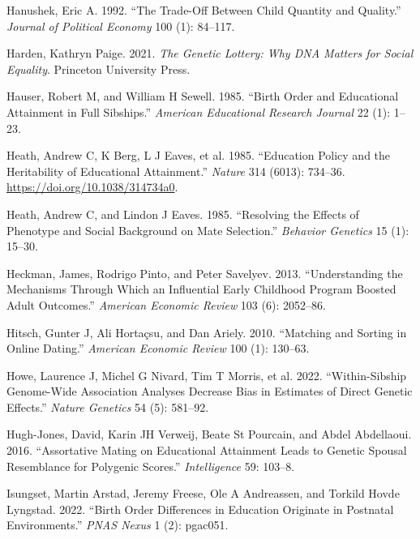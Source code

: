 \documentclass[
  12pt,
]{article}
\newlength{\cslhangindent}
\newenvironment{CSLReferences}[2] %
 {\begin{list}{}{%
  \setlength{\itemindent}{0pt}
  \setlength{\leftmargin}{0pt}
  \setlength{\parsep}{0pt}
  \ifodd #1
   \setlength{\leftmargin}{\cslhangindent}
   \setlength{\itemindent}{-1\cslhangindent}
  \fi
  \setlength{\itemsep}{#2\baselineskip}}}
 {\end{list}}
\theoremstyle{definition}
\theoremstyle{definition}
\theoremstyle{definition}
\theoremstyle{definition}
\theoremstyle{remark}
\begin{document}
\begin{CSLReferences}{1}{1}
Hanushek, Eric A. 1992. {``The Trade-Off Between Child Quantity and Quality.''} \emph{Journal of Political Economy} 100 (1): 84--117.

Harden, Kathryn Paige. 2021. \emph{The Genetic Lottery: Why DNA Matters for Social Equality}. Princeton University Press.

Hauser, Robert M, and William H Sewell. 1985. {``Birth Order and Educational Attainment in Full Sibships.''} \emph{American Educational Research Journal} 22 (1): 1--23.

Heath, Andrew C, K Berg, L J Eaves, et al. 1985. {``Education Policy and the Heritability of Educational Attainment.''} \emph{Nature} 314 (6013): 734--36. \url{https://doi.org/10.1038/314734a0}.

Heath, Andrew C, and Lindon J Eaves. 1985. {``Resolving the Effects of Phenotype and Social Background on Mate Selection.''} \emph{Behavior Genetics} 15 (1): 15--30.

Heckman, James, Rodrigo Pinto, and Peter Savelyev. 2013. {``Understanding the Mechanisms Through Which an Influential Early Childhood Program Boosted Adult Outcomes.''} \emph{American Economic Review} 103 (6): 2052--86.

Hitsch, Gunter J, Ali Hortaçsu, and Dan Ariely. 2010. {``Matching and Sorting in Online Dating.''} \emph{American Economic Review} 100 (1): 130--63.

{Howe, Laurence J, Michel G Nivard, Tim T Morris, et al.} 2022. {``Within-Sibship Genome-Wide Association Analyses Decrease Bias in Estimates of Direct Genetic Effects.''} \emph{Nature Genetics} 54 (5): 581--92.

Hugh-Jones, David, Karin JH Verweij, Beate St Pourcain, and Abdel Abdellaoui. 2016. {``Assortative Mating on Educational Attainment Leads to Genetic Spousal Resemblance for Polygenic Scores.''} \emph{Intelligence} 59: 103--8.

Isungset, Martin Arstad, Jeremy Freese, Ole A Andreassen, and Torkild Hovde Lyngstad. 2022. {``Birth Order Differences in Education Originate in Postnatal Environments.''} \emph{PNAS Nexus} 1 (2): pgac051.


\end{CSLReferences}
\end{document}
